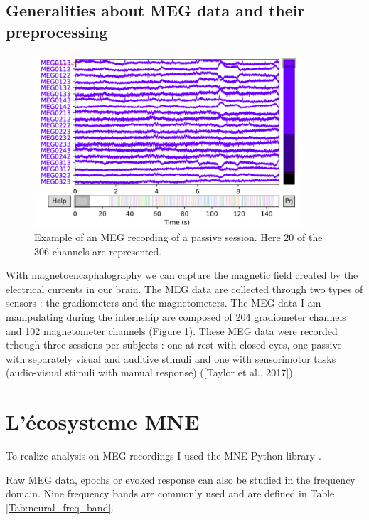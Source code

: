 \subsection{Generalities about MEG data and their preprocessing}

\begin{figure}[ht]
    \centering
    \includegraphics[width=10cm]{images_report/preprocessing/raw_data/Example_of_MEG_recording_reduced.png}
    \caption{Example of an MEG recording of a passive session. Here 20 of the 306 channels are represented.}
\end{figure}

With magnetoencaphalography we can capture the magnetic field created by the electrical currents in our brain. The MEG data are collected through two types of sensors : the gradiometers and the magnetometers. The MEG data I am manipulating during the internship are composed of 204 gradiometer channels and 102 magnetometer channels (Figure 1). These MEG data were recorded
trhough three sessions per subjects : one at rest with closed eyes, one passive with separately visual
and auditive stimuli and one with sensorimotor tasks (audio-visual stimuli with manual response)
([Taylor et al., 2017]).





\section{L'écosysteme MNE}

To realize analysis on MEG recordings I used the MNE-Python library \cite{GramfortEtAl2013a}.

Raw MEG data, epochs or evoked response can also be studied in the frequency domain. Nine
frequency bands are commonly used and are defined in Table \ref{Tab:neural_freq_band}.

